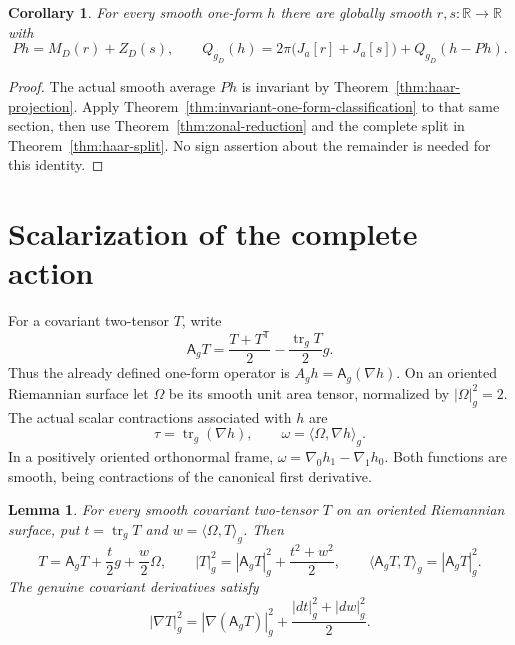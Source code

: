 \documentclass[11pt]{article}
\newtheorem{lemma}[theorem]{Lemma}
\newtheorem{corollary}[theorem]{Corollary}
\newcommand{\R}{\mathbb R}
\begin{document}
\begin{corollary}\label{cor:haar-zonal-action}
For every smooth one-form $h$ there are globally smooth $r,s:\R\to\R$ with
\[
 Ph=M_D(r)+Z_D(s),\qquad
 Q_{g_D}(h)=2\pi\bigl(J_a[r]+J_a[s]\bigr)+Q_{g_D}(h-Ph).
\]
\end{corollary}

\begin{proof}
The actual smooth average $Ph$ is invariant by
Theorem~\ref{thm:haar-projection}. Apply
Theorem~\ref{thm:invariant-one-form-classification} to that same section,
then use Theorem~\ref{thm:zonal-reduction} and the complete split in
Theorem~\ref{thm:haar-split}. No sign assertion about the remainder is
needed for this identity.
\end{proof}

\section{Scalarization of the complete action}

For a covariant two-tensor $T$, write
\[
 \mathsf A_gT=\frac{T+T^{\mathsf T}}2-\frac{\operatorname{tr}_gT}{2}g.
\]
Thus the already defined one-form operator is $A_gh=\mathsf A_g(\nabla h)$.
On an oriented Riemannian surface let $\Omega$ be its smooth unit area tensor,
normalized by $|\Omega|_g^2=2$. The actual scalar contractions associated with $h$ are
\[
 \tau=\operatorname{tr}_g(\nabla h),\qquad
 \omega=\langle\Omega,\nabla h\rangle_g.
\]
In a positively oriented orthonormal frame, $\omega=\nabla_0h_1-\nabla_1h_0$.
Both functions are smooth, being contractions of the canonical first derivative.

\begin{lemma}\label{lem:surface-tensor-splitting}
For every smooth covariant two-tensor $T$ on an oriented Riemannian surface,
put $t=\operatorname{tr}_gT$ and $w=\langle\Omega,T\rangle_g$. Then
\begin{equation}\label{eq:surface-tensor-split}
 T=\mathsf A_gT+\frac{t}{2}g+\frac{w}{2}\Omega,\qquad
 |T|_g^2=|\mathsf A_gT|_g^2+\frac{t^2+w^2}{2},\qquad
 \langle\mathsf A_gT,T\rangle_g=|\mathsf A_gT|_g^2.
\end{equation}
The genuine covariant derivatives satisfy
\begin{equation}\label{eq:surface-derivative-split}
 |\nabla T|_g^2=|\nabla(\mathsf A_gT)|_g^2+
                 \frac{|dt|_g^2+|dw|_g^2}{2}.
\end{equation}
\end{lemma}
\end{document}
